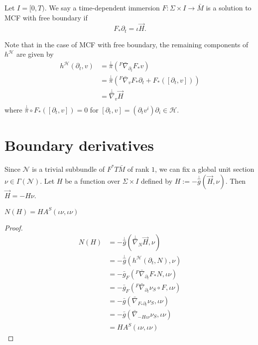 Let $I=[0,T)$. We say a time-dependent immersion $F\colon \Sigma \times I \to \bar{M}$ is a solution to MCF with free boundary if \[F_* \partial_t = \iota \vec{H}.\]

Note that in the case of MCF with free boundary, the remaining components of $h^{\mathcal{H} }$ are given by
\begin{equation*}
\begin{split}
    h^{\mathcal{H} }(\partial_t, v) 
&= \overset{\perp }{\pi} ({}^F \bar{\nabla }_{\partial _t} F_* v)  \\
&= \overset{\perp }{\pi} ({}^F \bar{\nabla }_{v} F_* \partial _t+F_*([\partial_t,v]))  \\
&= \overset{\perp }{\nabla} _v \vec{H}  \\
\end{split}
\end{equation*} 
where $\overset{\perp }{\pi} \circ  F_*([\partial_t,v])=0$ for $[\partial _t, v]=(\partial _t v^i) \partial _i \in \mathcal{H} $.

\section{Boundary derivatives} \label{sec:bd}

Since $\mathcal{N} $ is a trivial subbundle of $F^*T\bar{M} $  of rank $1$, we can fix a global unit section $\nu \in \Gamma (\mathcal{N} )$. Let $H$ be a function over $\Sigma \times I$ defined by $H:=-\overset{\perp }{g} (\vec{H},\nu )$. Then $\vec{H}=-H \nu $.

\begin{theorem}
    $N(H)=H A^S(\iota \nu , \iota \nu )$ 
\end{theorem}

\begin{proof}

    \begin{equation*}
    \begin{split}
        N(H)
    &= - \overset{\perp }{g} (\overset{\perp }{\nabla} _{N}\vec{H}, \nu )\\
    &= - \overset{\perp }{g} (h^{\mathcal{H} }(\partial _t, N), \nu )\\
    &=- \bar{g}_F({}^F \bar{\nabla } _{\partial_t }F_*N, \iota \nu)\\
    &= - \bar{g}_F({}^F \bar{\nabla } _{\partial_t } \nu _S \circ F, \iota \nu)\\
    &= - \bar{g}(\bar{\nabla }_{F_* \partial_t} \nu _S,\iota \nu )\\
    &= - \bar{g}(\bar{\nabla }_{-H \iota \nu } \nu _S,\iota \nu )\\
    &= H A^S(\iota \nu , \iota \nu )
    \end{split}
    \end{equation*}  
\end{proof}

